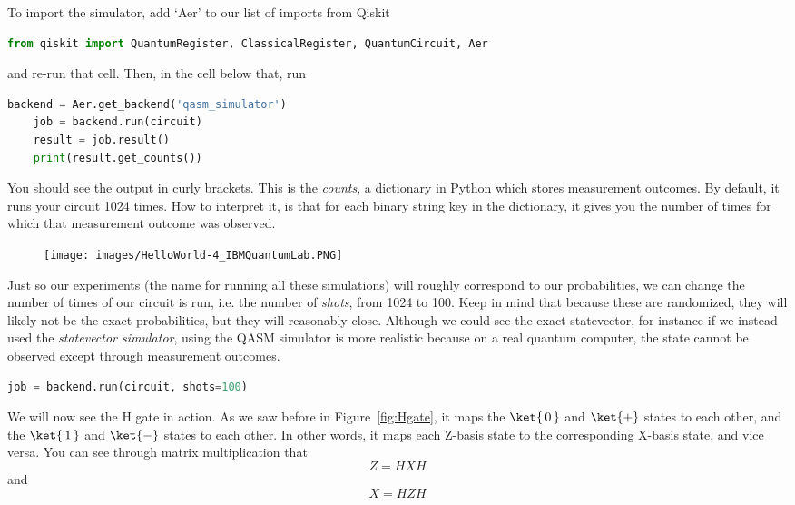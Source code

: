 \documentclass{article}
\theoremstyle{definition}
\newcommand{\kz}[1]{\ket{\,#1\,}}
\newcommand{\kx}[1]{\ket{#1}}
\begin{document}
To import the simulator, add `Aer' to our list of imports from Qiskit
\begin{lstlisting}[language=Python]
	from qiskit import QuantumRegister, ClassicalRegister, QuantumCircuit, Aer
\end{lstlisting}
and re-run that cell.  Then, in the cell below that, run
\begin{lstlisting}[language=Python]
	backend = Aer.get_backend('qasm_simulator')
	job = backend.run(circuit)
	result = job.result()
	print(result.get_counts())
\end{lstlisting}

You should see the output in curly brackets.  This is the \textit{counts}, a dictionary in Python which stores measurement outcomes.  By default, it runs your circuit 1024 times.  How to interpret it, is that for each binary string key in the dictionary, it gives you the number of times for which that measurement outcome was observed.
\begin{figure}[H]
	\texttt{[image: images/HelloWorld-4\_IBMQuantumLab.PNG]}
\end{figure}

Just so our experiments (the name for running all these simulations) will roughly correspond to our probabilities, we can change the number of times of our circuit is run, i.e. the number of \textit{shots}, from 1024 to 100.  Keep in mind that because these are randomized, they will likely not be the exact probabilities, but they will reasonably close.  Although we could see the exact statevector, for instance if we instead used the \textit{statevector simulator}, using the QASM simulator is more realistic because on a real quantum computer, the state cannot be observed except through measurement outcomes.
\begin{lstlisting}[language=Python]
	job = backend.run(circuit, shots=100)
\end{lstlisting}

We will now see the H gate in action.  As we saw before in Figure~\ref{fig:Hgate}, it maps the $\kz0$ and $\kx{+}$ states to each other, and the $\kz1$ and $\kx{-}$ states to each other.  In other words, it maps each Z-basis state to the corresponding X-basis state, and vice versa.
You can see through matrix multiplication that
\begin{equation}
	Z = H X H
\end{equation}
and
\begin{equation}
	X = H Z H
\end{equation}
\end{document}
